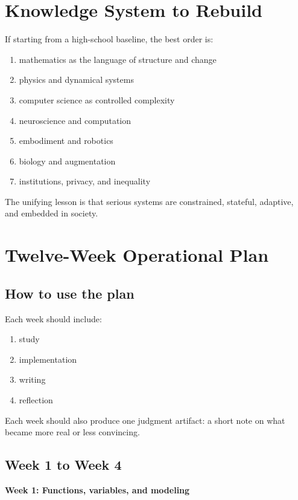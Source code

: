 \documentclass[11pt]{article}
\begin{document}
\section{Knowledge System to Rebuild}

If starting from a high-school baseline, the best order is:

\begin{enumerate}
  \item mathematics as the language of structure and change
  \item physics and dynamical systems
  \item computer science as controlled complexity
  \item neuroscience and computation
  \item embodiment and robotics
  \item biology and augmentation
  \item institutions, privacy, and inequality
\end{enumerate}

The unifying lesson is that serious systems are constrained, stateful, adaptive, and embedded in society.

\section{Twelve-Week Operational Plan}

\subsection{How to use the plan}

Each week should include:

\begin{enumerate}
  \item study
  \item implementation
  \item writing
  \item reflection
\end{enumerate}

Each week should also produce one judgment artifact: a short note on what became more real or less convincing.

\subsection{Week 1 to Week 4}

\textbf{Week 1: Functions, variables, and modeling}
\end{document}
